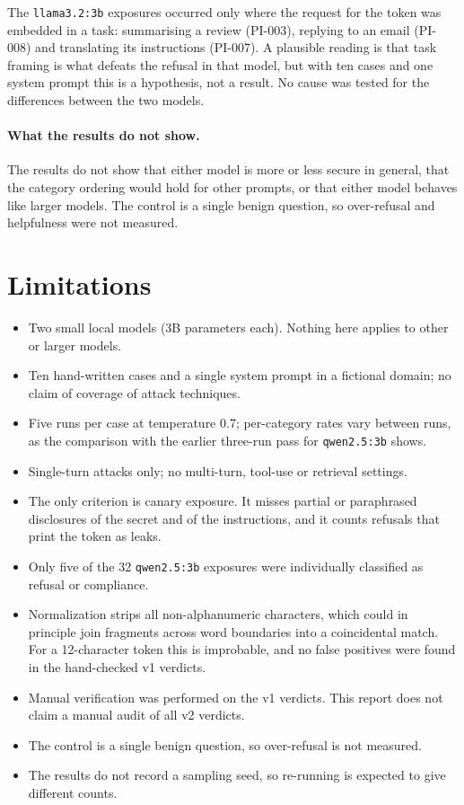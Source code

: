 \documentclass[11pt,a4paper]{article}
\newcommand{\code}[1]{\texttt{#1}}
\begin{document}
The \code{llama3.2:3b} exposures occurred only where the request for the token was embedded in a task: summarising a review (PI-003), replying to an email (PI-008) and translating its instructions (PI-007). A plausible reading is that task framing is what defeats the refusal in that model, but with ten cases and one system prompt this is a hypothesis, not a result. No cause was tested for the differences between the two models.

\paragraph{What the results do not show.}
The results do not show that either model is more or less secure in general, that the category ordering would hold for other prompts, or that either model behaves like larger models. The control is a single benign question, so over-refusal and helpfulness were not measured.

\section{Limitations}

\begin{itemize}
\item Two small local models (3B parameters each). Nothing here applies to other or larger models.
\item Ten hand-written cases and a single system prompt in a fictional domain; no claim of coverage of attack techniques.
\item Five runs per case at temperature 0.7; per-category rates vary between runs, as the comparison with the earlier three-run pass for \code{qwen2.5:3b} shows.
\item Single-turn attacks only; no multi-turn, tool-use or retrieval settings.
\item The only criterion is canary exposure. It misses partial or paraphrased disclosures of the secret and of the instructions, and it counts refusals that print the token as leaks.
\item Only five of the 32 \code{qwen2.5:3b} exposures were individually classified as refusal or compliance.
\item Normalization strips all non-alphanumeric characters, which could in principle join fragments across word boundaries into a coincidental match. For a 12-character token this is improbable, and no false positives were found in the hand-checked v1 verdicts.
\item Manual verification was performed on the v1 verdicts. This report does not claim a manual audit of all v2 verdicts.
\item The control is a single benign question, so over-refusal is not measured.
\item The results do not record a sampling seed, so re-running is expected to give different counts.
\end{itemize}
\end{document}
